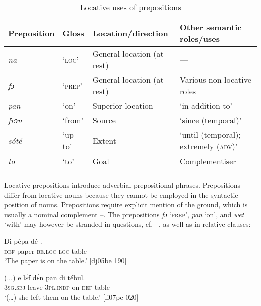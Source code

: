 \begin{table}
\caption{Locative uses of prepositions}
\label{tab:key:8.1}

\begin{tabularx}{\textwidth}{lllQ}
\lsptoprule
Preposition & Gloss & Location/direction & Other semantic roles/uses\\
\midrule 
\itshape na & ‘\textsc{loc}’ & General location (at rest) & {}---\\
\itshape fɔ & ‘\textsc{prep}’ & General location (at rest) & Various non-locative roles\\
\itshape pan & ‘on’ & Superior location & ‘in addition to’\\
\itshape frɔn & ‘from’ & Source & ‘since (temporal)’\\
\itshape sóté & ‘up to’ & Extent & ‘until (temporal); extremely (\textsc{adv})’\\
\itshape to & ‘to’ & Goal & Complementiser\\
\lspbottomrule
\end{tabularx}
\end{table}
Locative prepositions introduce adverbial prepositional phrases. Prepositions differ from locative nouns because they cannot be employed in the syntactic position of nouns. Prepositions require explicit mention of the ground, which is usually a nominal complement –. The prepositions \textit{fɔ} ‘\textsc{prep}’, \textit{pan} ‘on’, and \textit{wet} ‘with’ may however be stranded in questions, cf. –, as well as in relative clauses:


\ea%
    \label{ex:key:900}
    \gll Di  pépa  dé      .\\
\textsc{def}  paper  \textsc{be.loc}  \textsc{loc}  table\\

\glt ‘The paper is on the table.’ [dj05be 190]
\z


\ea%
    \label{ex:key:901}
    \gll (...)  e    lɛ́f    dɛ́n    pan  di  tébul.\\
{}  \textsc{3sg.sbj}  leave  \textsc{3pl.indp}  on  \textsc{def}  table\\

\glt ‘(…) she left them on the table.’ [li07pe 020]
\z


